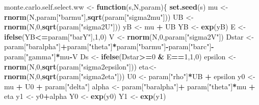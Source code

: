 \documentclass[]{book}
\newenvironment{Shaded}{\begin{snugshade}}{\end{snugshade}}
\newcommand{\ControlFlowTok}[1]{\textcolor[rgb]{0.13,0.29,0.53}{\textbf{#1}}}
\newcommand{\DecValTok}[1]{\textcolor[rgb]{0.00,0.00,0.81}{#1}}
\newcommand{\KeywordTok}[1]{\textcolor[rgb]{0.13,0.29,0.53}{\textbf{#1}}}
\newcommand{\NormalTok}[1]{#1}
\newcommand{\OperatorTok}[1]{\textcolor[rgb]{0.81,0.36,0.00}{\textbf{#1}}}
\newcommand{\StringTok}[1]{\textcolor[rgb]{0.31,0.60,0.02}{#1}}
\theoremstyle{definition}
\theoremstyle{definition}
\theoremstyle{definition}
\theoremstyle{remark}
\begin{document}
\begin{Shaded}
\begin{Highlighting}[]
\NormalTok{monte.carlo.self.select.ww <-}\StringTok{ }\ControlFlowTok{function}\NormalTok{(s,N,param)\{}
  \KeywordTok{set.seed}\NormalTok{(s)}
\NormalTok{  mu <-}\StringTok{ }\KeywordTok{rnorm}\NormalTok{(N,param[}\StringTok{"barmu"}\NormalTok{],}\KeywordTok{sqrt}\NormalTok{(param[}\StringTok{"sigma2mu"}\NormalTok{]))}
\NormalTok{  UB <-}\StringTok{ }\KeywordTok{rnorm}\NormalTok{(N,}\DecValTok{0}\NormalTok{,}\KeywordTok{sqrt}\NormalTok{(param[}\StringTok{"sigma2U"}\NormalTok{]))}
\NormalTok{  yB <-}\StringTok{ }\NormalTok{mu }\OperatorTok{+}\StringTok{ }\NormalTok{UB }
\NormalTok{  YB <-}\StringTok{ }\KeywordTok{exp}\NormalTok{(yB)}
\NormalTok{  E <-}\StringTok{ }\KeywordTok{ifelse}\NormalTok{(YB}\OperatorTok{<=}\NormalTok{param[}\StringTok{"barY"}\NormalTok{],}\DecValTok{1}\NormalTok{,}\DecValTok{0}\NormalTok{)}
\NormalTok{  V <-}\StringTok{ }\KeywordTok{rnorm}\NormalTok{(N,}\DecValTok{0}\NormalTok{,param[}\StringTok{"sigma2V"}\NormalTok{])}
\NormalTok{  Dstar <-}\StringTok{ }\NormalTok{param[}\StringTok{"baralpha"}\NormalTok{]}\OperatorTok{+}\NormalTok{param[}\StringTok{"theta"}\NormalTok{]}\OperatorTok{*}\NormalTok{param[}\StringTok{"barmu"}\NormalTok{]}\OperatorTok{-}\NormalTok{param[}\StringTok{"barc"}\NormalTok{]}\OperatorTok{-}\NormalTok{param[}\StringTok{"gamma"}\NormalTok{]}\OperatorTok{*}\NormalTok{mu}\OperatorTok{-}\NormalTok{V}
\NormalTok{  Ds <-}\StringTok{ }\KeywordTok{ifelse}\NormalTok{(Dstar}\OperatorTok{>=}\DecValTok{0} \OperatorTok{&}\StringTok{ }\NormalTok{E}\OperatorTok{==}\DecValTok{1}\NormalTok{,}\DecValTok{1}\NormalTok{,}\DecValTok{0}\NormalTok{)}
\NormalTok{  epsilon <-}\StringTok{ }\KeywordTok{rnorm}\NormalTok{(N,}\DecValTok{0}\NormalTok{,}\KeywordTok{sqrt}\NormalTok{(param[}\StringTok{"sigma2epsilon"}\NormalTok{]))}
\NormalTok{  eta<-}\StringTok{ }\KeywordTok{rnorm}\NormalTok{(N,}\DecValTok{0}\NormalTok{,}\KeywordTok{sqrt}\NormalTok{(param[}\StringTok{"sigma2eta"}\NormalTok{]))}
\NormalTok{  U0 <-}\StringTok{ }\NormalTok{param[}\StringTok{"rho"}\NormalTok{]}\OperatorTok{*}\NormalTok{UB }\OperatorTok{+}\StringTok{ }\NormalTok{epsilon}
\NormalTok{  y0 <-}\StringTok{ }\NormalTok{mu }\OperatorTok{+}\StringTok{  }\NormalTok{U0 }\OperatorTok{+}\StringTok{ }\NormalTok{param[}\StringTok{"delta"}\NormalTok{]}
\NormalTok{  alpha <-}\StringTok{ }\NormalTok{param[}\StringTok{"baralpha"}\NormalTok{]}\OperatorTok{+}\StringTok{  }\NormalTok{param[}\StringTok{"theta"}\NormalTok{]}\OperatorTok{*}\NormalTok{mu }\OperatorTok{+}\StringTok{ }\NormalTok{eta}
\NormalTok{  y1 <-}\StringTok{ }\NormalTok{y0}\OperatorTok{+}\NormalTok{alpha}
\NormalTok{  Y0 <-}\StringTok{ }\KeywordTok{exp}\NormalTok{(y0)}
\NormalTok{  Y1 <-}\StringTok{ }\KeywordTok{exp}\NormalTok{(y1)}
  

\end{Highlighting}
\end{Shaded}
\end{document}
